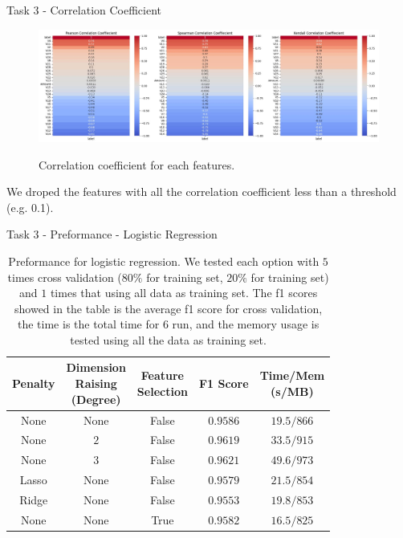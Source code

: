 \documentclass{beamer}
\begin{document}
\begin{frame}{Task 3 - Correlation Coefficient}

  \begin{figure}[H]
    \centering
    \includegraphics[width=\textwidth]{../code/Task3/Analysis/corrcoef.jpg} \\
    \caption{Correlation coefficient for each features.}
  \end{figure}

  We droped the features with all the correlation coefficient less than a threshold (e.g. 0.1).

\end{frame}

\begin{frame}{Task 3 - Preformance - Logistic Regression}

  \begin{table}[H]
    \centering
    \begin{tabular}{|c|c|c|c|c|}
      \hline
      Penalty & \makecell{Dimension                                 \\ Raising \\ (Degree)} & \makecell{Feature \\ Selection} & F1 Score & \makecell{Time/Mem \\ (s/MB)} \\
      \hline
      None    & None                & False & $0.9586$ & $19.5/866$ \\
      \hline
      None    & $2$                 & False & $0.9619$ & $33.5/915$ \\
      \hline
      None    & $3$                 & False & $0.9621$ & $49.6/973$ \\
      \hline
      Lasso   & None                & False & $0.9579$ & $21.5/854$ \\
      \hline
      Ridge   & None                & False & $0.9553$ & $19.8/853$ \\
      \hline
      None    & None                & True  & $0.9582$ & $16.5/825$ \\
      \hline
    \end{tabular}
    \caption{Preformance for logistic regression. We tested each option with $5$ times cross validation ($80\%$ for training set, $20\%$ for training set) and $1$ times that using all data as training set. The f1 scores showed in the table is the average f1 score for cross validation, the time is the total time for $6$ run, and the memory usage is tested using all the data as training set.}
  \end{table}

\end{frame}
\end{document}
